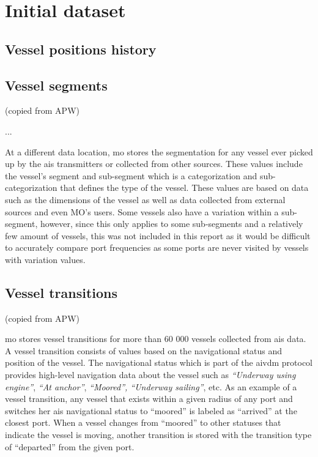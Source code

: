 \chapter{Initial dataset}

\section{Vessel positions history}

\section{Vessel segments}
\label{sec:vessel_segments}

(copied from APW)

...

At a different data location, \acrshort{mo} stores the segmentation for any vessel ever picked up by the \acrshort{ais} transmitters or collected from other sources. These values include the vessel’s segment and sub-segment which is a categorization and sub-categorization that defines the type of the vessel. These values are based on data such as the dimensions of the vessel as well as data collected from external sources and even MO’s users. Some vessels also have a variation within a sub-segment, however, since this only applies to some sub-segments and a relatively few amount of vessels, this was not included in this report as it would be difficult to accurately compare port frequencies as some ports are never visited by vessels with variation values.

\section{Vessel transitions}
\label{sec:vessel_transitions}

(copied from APW)

\acrfull{mo} stores vessel transitions for more than 60 000 vessels collected from \acrfull{ais} data. A vessel transition consists of values based on the navigational status and position of the vessel. The navigational status which is part of the \Gls{aivdm} protocol provides high-level navigation data about the vessel such as \textit{“Underway using engine”}, \textit{“At anchor”}, \textit{“Moored”, “Underway sailing”}, etc. As an example of a vessel transition, any vessel that exists within a given radius of any port and switches her \acrshort{ais} navigational status to “moored” is labeled as “arrived” at the closest port. When a vessel changes from “moored” to other statuses that indicate the vessel is moving, another transition is stored with the transition type of “departed” from the given port.

